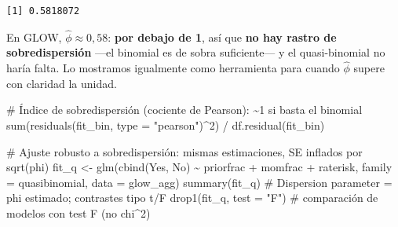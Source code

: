 \documentclass[
  letterpaper,
  DIV=11,
  numbers=noendperiod]{scrartcl}
\newenvironment{Shaded}{\begin{snugshade}}{\end{snugshade}}
\newcommand{\AttributeTok}[1]{\textcolor[rgb]{0.40,0.45,0.13}{#1}}
\newcommand{\CommentTok}[1]{\textcolor[rgb]{0.37,0.37,0.37}{#1}}
\newcommand{\DecValTok}[1]{\textcolor[rgb]{0.68,0.00,0.00}{#1}}
\newcommand{\FunctionTok}[1]{\textcolor[rgb]{0.28,0.35,0.67}{#1}}
\newcommand{\NormalTok}[1]{\textcolor[rgb]{0.00,0.23,0.31}{#1}}
\newcommand{\OtherTok}[1]{\textcolor[rgb]{0.00,0.23,0.31}{#1}}
\newcommand{\SpecialCharTok}[1]{\textcolor[rgb]{0.37,0.37,0.37}{#1}}
\newcommand{\StringTok}[1]{\textcolor[rgb]{0.13,0.47,0.30}{#1}}
\begin{document}
\begin{verbatim}
[1] 0.5818072
\end{verbatim}

En GLOW, \(\hat\phi\approx 0{,}58\): \textbf{por debajo de 1}, así que
\textbf{no hay rastro de sobredispersión} ---el binomial es de sobra
suficiente--- y el quasi-binomial no haría falta. Lo mostramos
igualmente como herramienta para cuando \(\hat\phi\) supere con claridad
la unidad.

\begin{tcolorbox}[enhanced jigsaw, coltitle=black, rightrule=.15mm, arc=.35mm, leftrule=.75mm, colback=white, colbacktitle=quarto-callout-tip-color!10!white, left=2mm, breakable, toptitle=1mm, toprule=.15mm, bottomtitle=1mm, titlerule=0mm, title=\textcolor{quarto-callout-tip-color}{\faLightbulb}\hspace{0.5em}{🔧 En R. Sobredispersión y quasi-binomial}, bottomrule=.15mm, opacityback=0, opacitybacktitle=0.6, colframe=quarto-callout-tip-color-frame]

\begin{Shaded}
\begin{Highlighting}[]
\CommentTok{\# Índice de sobredispersión (cociente de Pearson): \textasciitilde{}1 si basta el binomial}
\FunctionTok{sum}\NormalTok{(}\FunctionTok{residuals}\NormalTok{(fit\_bin, }\AttributeTok{type =} \StringTok{"pearson"}\NormalTok{)}\SpecialCharTok{\^{}}\DecValTok{2}\NormalTok{) }\SpecialCharTok{/} \FunctionTok{df.residual}\NormalTok{(fit\_bin)}

\CommentTok{\# Ajuste robusto a sobredispersión: mismas estimaciones, SE inflados por sqrt(phi)}
\NormalTok{fit\_q }\OtherTok{\textless{}{-}} \FunctionTok{glm}\NormalTok{(}\FunctionTok{cbind}\NormalTok{(Yes, No) }\SpecialCharTok{\textasciitilde{}}\NormalTok{ priorfrac }\SpecialCharTok{+}\NormalTok{ momfrac }\SpecialCharTok{+}\NormalTok{ raterisk,}
             \AttributeTok{family =}\NormalTok{ quasibinomial, }\AttributeTok{data =}\NormalTok{ glow\_agg)}
\FunctionTok{summary}\NormalTok{(fit\_q)             }\CommentTok{\# \textquotesingle{}Dispersion parameter\textquotesingle{} = phi estimado; contrastes tipo t/F}
\FunctionTok{drop1}\NormalTok{(fit\_q, }\AttributeTok{test =} \StringTok{"F"}\NormalTok{)   }\CommentTok{\# comparación de modelos con test F (no chi\^{}2)}
\end{Highlighting}
\end{Shaded}

\end{tcolorbox}
\end{document}
